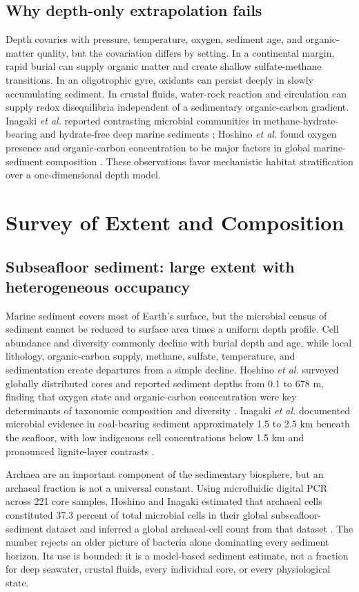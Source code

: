 \documentclass[conference]{../../../../Conference-LaTeX-template_10-17-19/IEEEtran}
\begin{document}
\subsection{Why depth-only extrapolation fails}
Depth covaries with pressure, temperature, oxygen, sediment age, and organic-matter quality, but the covariation differs by setting. In a continental margin, rapid burial can supply organic matter and create shallow sulfate-methane transitions. In an oligotrophic gyre, oxidants can persist deeply in slowly accumulating sediment. In crustal fluids, water-rock reaction and circulation can supply redox disequilibria independent of a sedimentary organic-carbon gradient. Inagaki \textit{et al.} reported contrasting microbial communities in methane-hydrate-bearing and hydrate-free deep marine sediments \cite{inagaki2006}; Hoshino \textit{et al.} found oxygen presence and organic-carbon concentration to be major factors in global marine-sediment composition \cite{hoshino2020}. These observations favor mechanistic habitat stratification over a one-dimensional depth model.

\section{Survey of Extent and Composition}
\subsection{Subseafloor sediment: large extent with heterogeneous occupancy}
Marine sediment covers most of Earth's surface, but the microbial census of sediment cannot be reduced to surface area times a uniform depth profile. Cell abundance and diversity commonly decline with burial depth and age, while local lithology, organic-carbon supply, methane, sulfate, temperature, and sedimentation create departures from a simple decline. Hoshino \textit{et al.} surveyed globally distributed cores and reported sediment depths from 0.1 to 678 m, finding that oxygen state and organic-carbon concentration were key determinants of taxonomic composition and diversity \cite{hoshino2020}. Inagaki \textit{et al.} documented microbial evidence in coal-bearing sediment approximately 1.5 to 2.5 km beneath the seafloor, with low indigenous cell concentrations below 1.5 km and pronounced lignite-layer contrasts \cite{inagaki2015}.

Archaea are an important component of the sedimentary biosphere, but an archaeal fraction is not a universal constant. Using microfluidic digital PCR across 221 core samples, Hoshino and Inagaki estimated that archaeal cells constituted 37.3 percent of total microbial cells in their global subseafloor-sediment dataset and inferred a global archaeal-cell count from that dataset \cite{hoshino2018}. The number rejects an older picture of bacteria alone dominating every sediment horizon. Its use is bounded: it is a model-based sediment estimate, not a fraction for deep seawater, crustal fluids, every individual core, or every physiological state.
\end{document}
